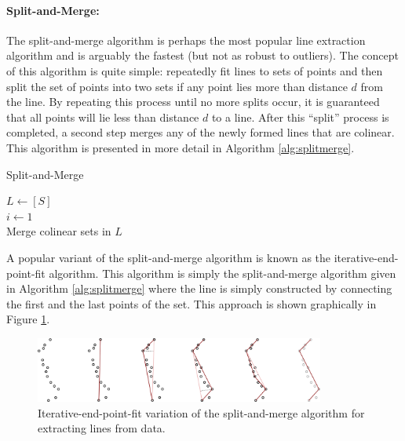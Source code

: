\paragraph{Split-and-Merge:}
The split-and-merge algorithm is perhaps the most popular line extraction algorithm and is arguably the fastest (but not as robust to outliers). The concept of this algorithm is quite simple: repeatedly fit lines to sets of points and then split the set of points into two sets if any point lies more than distance $d$ from the line. By repeating this process until no more splits occur, it is guaranteed that all points will lie less than distance $d$ to a line. After this ``split'' process is completed, a second step merges any of the newly formed lines that are colinear. This algorithm is presented in more detail in Algorithm \ref{alg:splitmerge}.
\begin{algorithm}[ht]\caption{Split-and-Merge} \label{alg:splitmerge}
	$L \xleftarrow{} [S]$ \\
	$i \xleftarrow{} 1$ \\
	Merge colinear sets in $L$
\end{algorithm}
A popular variant of the split-and-merge algorithm is known as the iterative-end-point-fit algorithm. This algorithm is simply the split-and-merge algorithm given in Algorithm \ref{alg:splitmerge} where the line is simply constructed by connecting the first and the last points of the set. This approach is shown graphically in Figure \ref{fig:splitmerge}.
\begin{figure}[ht]
\centering
	\includegraphics[width=0.85\textwidth]{tex/figs/ch12_fig/iterative_end_point_fit.png}
	\caption{Iterative-end-point-fit variation of the split-and-merge algorithm for extracting lines from data.}
	\label{fig:splitmerge}
\end{figure}

